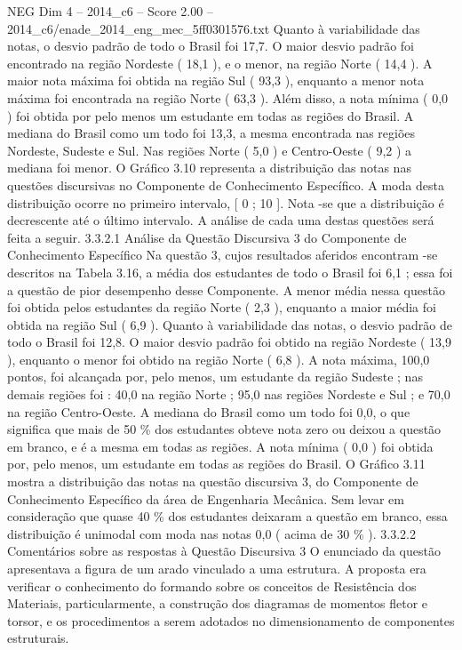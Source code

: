 \begin{textsample}{NEG Dim 4 – 2014\_c6 – Score 2.00 – 2014\_c6/enade\_2014\_eng\_mec\_5ff0301576.txt}
Quanto à variabilidade das notas, o desvio padrão de todo o Brasil foi 17,7.
O maior desvio padrão foi encontrado na região Nordeste ( 18,1 ), e o menor, na região Norte ( 14,4 ).
A maior nota máxima foi obtida na região Sul ( 93,3 ), enquanto a menor nota máxima foi encontrada na região Norte ( 63,3 ).
Além disso, a nota mínima ( 0,0 ) foi obtida por pelo menos um estudante em todas as regiões do Brasil.
A mediana do Brasil como um todo foi 13,3, a mesma encontrada nas regiões Nordeste, Sudeste e Sul.
Nas regiões Norte ( 5,0 ) e Centro-Oeste ( 9,2 ) a mediana foi menor.
O Gráfico 3.10 representa a distribuição das notas nas questões discursivas no Componente de Conhecimento Específico.
A moda desta distribuição ocorre no primeiro intervalo, [ 0 ; 10 ].
Nota -se que a distribuição é decrescente até o último intervalo.
A análise de cada uma destas questões será feita a seguir. 3.3.2.1 Análise da Questão Discursiva 3 do Componente de Conhecimento Específico Na questão 3, cujos resultados aferidos encontram -se descritos na Tabela 3.16, a média dos estudantes de todo o Brasil foi 6,1 ; essa foi a questão de pior desempenho desse Componente.
A menor média nessa questão foi obtida pelos estudantes da região Norte ( 2,3 ), enquanto a maior média foi obtida na região Sul ( 6,9 ).
Quanto à variabilidade das notas, o desvio padrão de todo o Brasil foi 12,8.
O maior desvio padrão foi obtido na região Nordeste ( 13,9 ), enquanto o menor foi obtido na região Norte ( 6,8 ).
A nota máxima, 100,0 pontos, foi alcançada por, pelo menos, um estudante da região Sudeste ; nas demais regiões foi : 40,0 na região Norte ; 95,0 nas regiões Nordeste e Sul ; e 70,0 na região Centro-Oeste.
A mediana do Brasil como um todo foi 0,0, o que significa que mais de 50 \% dos estudantes obteve nota zero ou deixou a questão em branco, e é a mesma em todas as regiões.
A nota mínima ( 0,0 ) foi obtida por, pelo menos, um estudante em todas as regiões do Brasil.
O Gráfico 3.11 mostra a distribuição das notas na questão discursiva 3, do Componente de Conhecimento Específico da área de Engenharia Mecânica.
Sem levar em consideração que quase 40 \% dos estudantes deixaram a questão em branco, essa distribuição é unimodal com moda nas notas 0,0 ( acima de 30 \% ). 3.3.2.2 Comentários sobre as respostas à Questão Discursiva 3 O enunciado da questão apresentava a figura de um arado vinculado a uma estrutura.
A proposta era verificar o conhecimento do formando sobre os conceitos de Resistência dos Materiais, particularmente, a construção dos diagramas de momentos fletor e torsor, e os procedimentos a serem adotados no dimensionamento de componentes estruturais.

\end{textsample}
